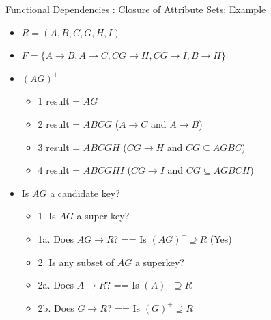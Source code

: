\documentclass[aspectratio=169, xcolor=dvipsnames]{beamer}
\begin{document}
\begin{frame}{Functional Dependencies : Closure of Attribute Sets: Example}
    \begin{itemize}[<+->]
        \item $R = (A, B, C, G, H, I)$
        \item $F = \{A \rightarrow B, A \rightarrow C, CG \rightarrow H, CG \rightarrow I, B \rightarrow H\}$
        \item $(AG)^+$
        \begin{itemize}
            \item[$\triangleright$] 1 result = $AG$
            \item[$\triangleright$] 2 result = $ABCG$ ($A \rightarrow C$ and $A \rightarrow B$)
            \item[$\triangleright$] 3 result = $ABCGH$ ($CG \rightarrow H$ and $CG \subseteq AGBC$)
            \item[$\triangleright$] 4 result = $ABCGHI$ ($CG \rightarrow I$ and $CG \subseteq AGBCH$)
        \end{itemize}
        \item Is $AG$ a candidate key?
        \begin{itemize}
            \item[$\triangleright$] 1. Is $AG$ a super key?
            \item[$\triangleright$] \hspace{1em} 1a. Does $AG \rightarrow R$? == Is $(AG)^+ \supseteq R$ (Yes)
            \item[$\triangleright$] 2. Is any subset of $AG$ a superkey?
            \item[$\triangleright$] \hspace{1em} 2a. Does $A \rightarrow R$? == Is $(A)^+ \supseteq R$
            \item[$\triangleright$] \hspace{1em} 2b. Does $G \rightarrow R$? == Is $(G)^+ \supseteq R$
        \end{itemize}
    \end{itemize}
\end{frame}
\end{document}
